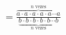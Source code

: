 \documentclass[preview]{standalone}
\begin{document}
\begin{align*}
=\frac{\overbrace{a\cdot a\cdot a\cdot a\cdot a\cdots a}^{n \text{ vezes}}}{\underbrace{b\cdot b\cdot b \cdot b \cdot b \cdots b}_{n \text{ vezes}}}
\end{align*}
\end{document}
